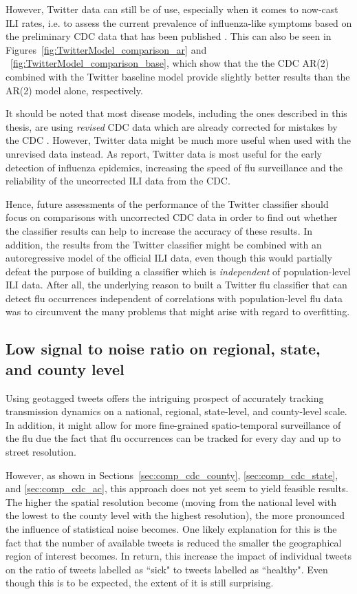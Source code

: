\documentclass[11pt, a4paper,twoside]{report}\usepackage[]{graphicx}\usepackage[]{color}
\begin{document}
However, Twitter data can still be of use, especially when it comes to now-cast ILI rates, i.e. to assess the current prevalence of influenza-like symptoms based on the preliminary CDC data that has been published \citep{paul_worldwide_2015}. This can also be seen in Figures~\ref{fig:TwitterModel_comparison_ar} and ~\ref{fig:TwitterModel_comparison_base}, which show that the the CDC AR(2) combined with the Twitter baseline model provide slightly better results than the AR(2) model alone, respectively. 

It should be noted that most disease models, including the ones described in this thesis, are using \textit{revised} CDC data which are already corrected for mistakes by the CDC \citep{paul_twitter_2014}. However, Twitter data might be much more useful when used with the unrevised data instead. As \cite{aramaki_twitter_2011} report, Twitter data is most useful for the early detection of influenza epidemics, increasing the speed of flu surveillance and the reliability of the uncorrected ILI data from the CDC. 

Hence, future assessments of the performance of the Twitter classifier should focus on comparisons with uncorrected CDC data in order to find out whether the classifier results can help to increase the accuracy of these results. In addition, the results from the Twitter classifier might be combined with an autoregressive model of the official ILI data, even though this would partially defeat the purpose of building a classifier which is \textit{independent} of population-level ILI data. After all, the underlying reason to built a Twitter flu classifier that can detect flu occurrences independent of correlations with population-level flu data was to circumvent the many problems that might arise with regard to overfitting. 

\subsection{Low signal to noise ratio on regional, state, and county level}
Using geotagged tweets offers the intriguing prospect of accurately tracking transmission dynamics on a national, regional, state-level, and county-level scale. In addition, it might allow for more fine-grained spatio-temporal surveillance of the flu due the fact that flu occurrences can be tracked for every day and up to street resolution. 

However, as shown in Sections~\ref{sec:comp_cdc_county}, \ref{sec:comp_cdc_state}, and \ref{sec:comp_cdc_ac}, this approach does not yet seem to yield feasible results. The higher the spatial resolution become (moving from the national level with the lowest to the county level with the highest resolution), the more pronounced the influence of statistical noise becomes. One likely explanation for this is the fact that the number of available tweets is reduced the smaller the geographical region of interest becomes. In return, this increase the impact of individual tweets on the ratio of tweets labelled as ``sick" to tweets labelled as ``healthy". Even though this is to be expected, the extent of it is still surprising. 
\end{document}
